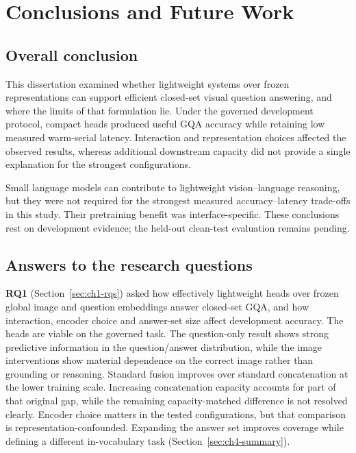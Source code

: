 \chapter{Conclusions and Future Work}

\section{Overall conclusion}
\label{sec:ch9-overall}

This dissertation examined whether lightweight systems over frozen
representations can support efficient closed-set visual question answering,
and where the limits of that formulation lie. Under the governed development
protocol, compact heads produced useful GQA accuracy while retaining low
measured warm-serial latency. Interaction and representation choices affected
the observed results, whereas additional downstream capacity did not provide a
single explanation for the strongest configurations.

Small language models can contribute to lightweight vision--language
reasoning, but they were not required for the strongest measured
accuracy--latency trade-offs in this study. Their pretraining benefit was
interface-specific. These conclusions rest on development evidence; the
held-out clean-test evaluation remains pending.

\section{Answers to the research questions}
\label{sec:ch9-answers}

\textbf{RQ1} (Section~\ref{sec:ch1-rqs}) asked how effectively lightweight heads over frozen global image
and question embeddings answer closed-set GQA, and how interaction, encoder
choice and answer-set size affect development accuracy. The heads are viable
on the governed task. The question-only result shows strong predictive
information in the question/answer distribution, while the image
interventions show material dependence on the correct image rather than
grounding or reasoning. Standard fusion improves over standard concatenation
at the lower training scale. Increasing concatenation capacity accounts for
part of that original gap, while the remaining capacity-matched difference is
not resolved clearly. Encoder choice matters in the tested configurations,
but that comparison is representation-confounded. Expanding the answer set
improves coverage while defining a different in-vocabulary task
(Section~\ref{sec:ch4-summary}).

